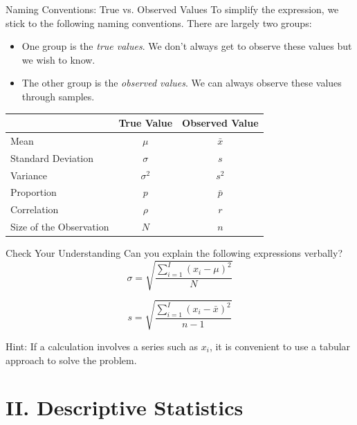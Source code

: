 \documentclass{beamer}
\begin{document}
\begin{frame}{Naming Conventions: True vs. Observed Values}
To simplify the expression, we stick to the following naming conventions. There are largely two groups:
\begin{itemize}
\item One group is the \textit{true values}. We don't always get to observe these values but we wish to know. 
\item The other group is the \textit{observed values}. We can always observe these values through samples. 
\end{itemize}

\begin{center}


\begin{small}
\begin{tabular}{l|c|c}
\hline
                   & True Value   & Observed Value   \\
\hline
\hline
Mean               & $\mu$        &  $\bar{x}$       \\
\hline
Standard Deviation & $\sigma$      &  $s$              \\
\hline
Variance           & $\sigma^2$   & $s^2$        \\
\hline
Proportion         & $p$          & $\bar{p}$ \\
\hline
Correlation        & $\rho$       & $r$     \\
\hline
Size of the Observation        & $N$       & $n$     \\
\hline
\end{tabular}
\end{small}

\end{center}

\end{frame}


\begin{frame}{Check Your Understanding}
Can you explain the following expressions verbally? 
$$ \sigma = \sqrt{\frac{\sum_{i=1}^I(x_i - \mu)^2}{N}}$$


$$ s = \sqrt{\frac{\sum_{i=1}^I(x_i - \bar{x})^2}{n-1}}$$

Hint: If a calculation involves a series such as $x_i$, it is convenient to use a tabular approach to solve the problem. 

\end{frame}



\section{II. Descriptive Statistics}
\end{document}
